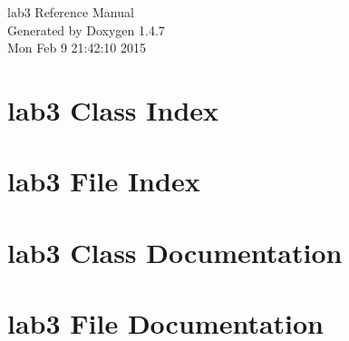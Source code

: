 \documentclass[a4paper]{book}
\begin{document}
\begin{titlepage}
\vspace*{7cm}
\begin{center}
{\Large lab3 Reference Manual}\\
\vspace*{1cm}
{\large Generated by Doxygen 1.4.7}\\
\vspace*{0.5cm}
{\small Mon Feb 9 21:42:10 2015}\\
\end{center}
\end{titlepage}
\clearemptydoublepage
{}
\tableofcontents
\clearemptydoublepage
{}
\chapter{lab3 Class Index}

\chapter{lab3 File Index}

\chapter{lab3 Class Documentation}

\chapter{lab3 File Documentation}





\printindex
\end{document}
